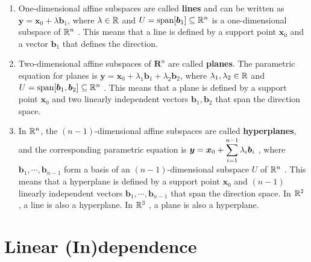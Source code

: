 \begin{enumerate}
    \item One-dimensional affine subspaces are called \textbf{lines} and can be written as $\bm{y} = \bm{x}_0 + \lambda \bm{b}_1$, where $\lambda  \in \mathbb{R}$ and $U = \text{span}[\bm{b}_1] \subseteq \mathbb{R}^n$ is a one-dimensional subspace of $\mathbb{R}^n$ .
    This means that a line is defined by a support point $\bm{x}_0$ and a vector $\bm{b}_1$ that defines the direction.
    \hfill \cite{mfml/book/mml/Deisenroth-Faisal-Ong}

    \item Two-dimensional affine subspaces of $\bm{R}^n$ are called \textbf{planes}.
    The parametric equation for planes is $\bm{y} = \bm{x}_0 + \lambda _1 \bm{b}_1 + \lambda _2 \bm{b}_2$, where $\lambda _1, \lambda _2 \in \mathbb{R}$ and $U = \text{span}[\bm{b}_1, \bm{b}_2] \subseteq \mathbb{R}^n$ .
    This means that a plane is defined by a support point $\bm{x}_0$ and two linearly independent vectors $\bm{b}_1, \bm{b}_2$ that span the direction space.
    \hfill \cite{mfml/book/mml/Deisenroth-Faisal-Ong}

    \item In $\mathbb{R}^n$, the $(n - 1)$-dimensional affine subspaces are called \textbf{hyperplanes}, and the corresponding parametric equation is $\bm{y} = \bm{x}_0 + \displaystyle\sum^ {n-1} _{i=1} \lambda_i \bm{b}_i$ , where $\bm{b}_1, \cdots , \bm{b}_{n-1}$ form a basis of an $(n - 1)$-dimensional subspace $U$ of $\mathbb{R}^n$ .
    This means that a hyperplane is defined by a support point $\bm{x}_0$ and $(n - 1)$ linearly independent vectors $\bm{b}_1, \cdots , \bm{b}_{n-1}$ that span the direction space.
    In $\mathbb{R}^2$ , a line is also a hyperplane.
    In $\mathbb{R}^3$ , a plane is also a hyperplane.
    \hfill \cite{mfml/book/mml/Deisenroth-Faisal-Ong}


\end{enumerate}

















\section{Linear (In)dependence}

